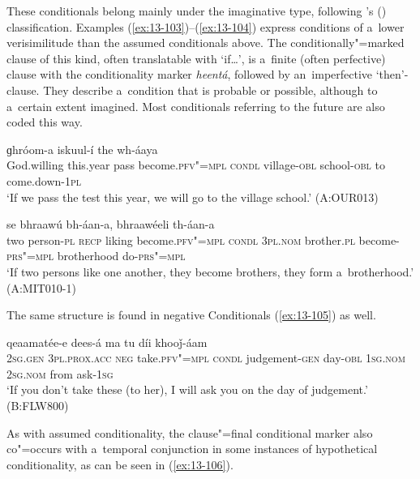  These conditionals belong mainly under the imaginative type, following \citeauthor{thompsonetal2007}'s (\citeyear[259--260]{thompsonetal2007}) classification. Examples (\ref{ex:13-103})--(\ref{ex:13-104}) express conditions of a~lower verisimilitude than the assumed conditionals above. The conditionally"=marked clause of this kind, often translatable with `if{\ldots}', is a~finite (often perfective) clause with the conditionality marker \textit{heentá}, followed by an~imperfective `then'-clause. They describe a~condition that is probable or possible, although to a~certain extent imagined. Most conditionals referring to the future are also coded this way.

\begin{exe}
\ex
\label{ex:13-103}
  ɡhróom-a iskuul-í the wh-áaya \\
 God.willing this.year  pass become.\textsc{pfv"=mpl} \textsc{condl}  village-\textsc{obl} school-\textsc{obl} to come.down-\textsc{1pl} \\
\glt `If we pass the test this year, we will go to the village school.' (A:OUR013)

\ex
\label{ex:13-104}
 se bhraawú bh-áan-a,
bhraawéeli  th-áan-a \\
two person-\textsc{pl} \textsc{recp} liking become.\textsc{pfv"=mpl}  \textsc{condl } \textsc{3pl.nom} brother.\textsc{pl} become-\textsc{prs"=mpl} brotherhood do-\textsc{prs"=mpl} \\
\glt `If two persons like one another, they become brothers, they form a~brotherhood.' (A:MIT010-1) 
\end{exe}

The same structure is found in negative Conditionals (\ref{ex:13-105}) as well.

\begin{exe}
\ex
\label{ex:13-105}
  qeaamatée-e dees-á ma tu díi khooǰ-áam \\
\textsc{2sg.gen} \textsc{3pl.prox.acc} \textsc{neg} take.\textsc{pfv"=mpl} \textsc{condl} judgement-\textsc{gen} day-\textsc{obl} \textsc{1sg.nom} \textsc{2sg.nom} from ask-\textsc{1sg}  \\
\glt `If you don't take these (to her), I will ask you on the day of judgement.' (B:FLW800) 
\end{exe}

As with assumed conditionality, the clause"=final conditional marker also co"=occurs with a~temporal conjunction in some instances of hypothetical conditionality, as can be seen in (\ref{ex:13-106}). 

